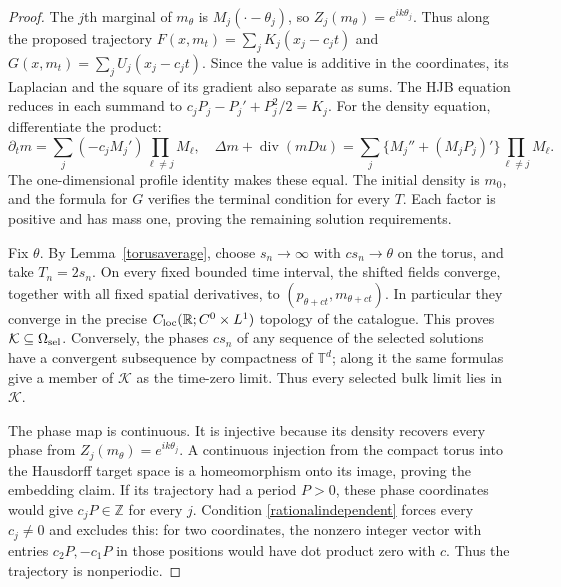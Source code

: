 \documentclass[11pt]{article}
\newcommand{\R}{\mathbb R}
\newcommand{\Z}{\mathbb Z}
\newcommand{\T}{\mathbb T}
\begin{document}
\begin{proof}
The $j$th marginal of $m_\theta$ is $M_j(\cdot-\theta_j)$, so
$Z_j(m_\theta)=e^{ik\theta_j}$. Thus along the proposed trajectory
$F(x,m_t)=\sum_jK_j(x_j-c_jt)$ and
$G(x,m_t)=\sum_jU_j(x_j-c_jt)$.
Since the value is additive in the coordinates, its Laplacian and the
square of its gradient also separate as sums. The HJB equation reduces
in each summand to $c_jP_j-P_j'+P_j^2/2=K_j$.
For the density equation, differentiate the product:
\[
 \partial_t m=\sum_j(-c_j M_j')\prod_{\ell\ne j}M_\ell,
 \quad
 \Delta m+\operatorname{div}(mDu)
 =\sum_j\{M_j''+(M_jP_j)'\}\prod_{\ell\ne j}M_\ell.
\]
The one-dimensional profile identity makes these equal. The initial
density is $m_0$, and the formula for $G$ verifies the terminal condition
for every $T$. Each factor is positive and has mass one, proving the
remaining solution requirements.

Fix $\theta$. By Lemma~\ref{torusaverage}, choose $s_n\to\infty$
with $cs_n\to\theta$ on the torus, and take $T_n=2s_n$.
On every fixed bounded time interval, the shifted fields converge,
together with all fixed spatial derivatives, to
$(p_{\theta+ct},m_{\theta+ct})$. In particular they converge in the
precise $C_{\rm loc}(\R;C^0\times L^1)$ topology of the catalogue.
This proves $\mathcal K\subseteq\Omega_{\rm sel}$.
Conversely, the phases $cs_n$ of any sequence of the selected solutions
have a convergent subsequence by compactness of $\T^d$; along it the
same formulas give a member of $\mathcal K$ as the time-zero limit.
Thus every selected bulk limit lies in $\mathcal K$.

The phase map is continuous. It is injective because its density
recovers every phase from $Z_j(m_\theta)=e^{ik\theta_j}$.
A continuous injection from the compact torus into the Hausdorff target
space is a homeomorphism onto its image, proving the embedding claim.
If its trajectory had a period $P>0$, these phase coordinates would give
$c_jP\in\Z$ for every $j$. Condition \eqref{rationalindependent}
forces every $c_j\ne0$ and excludes this: for two coordinates, the
nonzero integer vector with entries $c_2P,-c_1P$ in those positions
would have dot product zero with $c$. Thus the trajectory is nonperiodic.


\end{proof}
\end{document}
